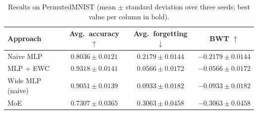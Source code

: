 \begin{table}[H]
  \centering
  \small
  \caption{Results on PermutedMNIST (mean $\pm$ standard deviation over three seeds; best value per column in bold).}
  \label{tab:results_permuted_mnist}
  \begin{tabular}{lccc}
    \toprule
    \textbf{Approach} & \textbf{Avg.\ accuracy} $\uparrow$ & \textbf{Avg.\ forgetting} $\downarrow$ & \textbf{BWT} $\uparrow$ \\
    \midrule
    Naive MLP & $0.8036 \pm 0.0121$ & $0.2179 \pm 0.0144$ & $-0.2179 \pm 0.0144$ \\
    MLP + EWC & \textbf{$0.9318 \pm 0.0141$} & \textbf{$0.0566 \pm 0.0172$} & \textbf{$-0.0566 \pm 0.0172$} \\
    Wide MLP (naive) & $0.9051 \pm 0.0139$ & $0.0933 \pm 0.0182$ & $-0.0933 \pm 0.0182$ \\
    MoE & $0.7307 \pm 0.0365$ & $0.3063 \pm 0.0458$ & $-0.3063 \pm 0.0458$ \\
    \bottomrule
  \end{tabular}
\end{table}
